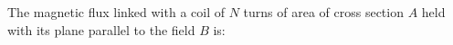 The magnetic flux linked with a coil of $N$ turns of area of cross section 
$A$ held with its plane parallel to the field $B$ is: